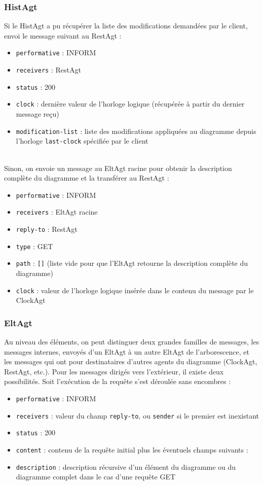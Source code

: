 \subsubsection{HistAgt}
Si le HistAgt a pu récupérer la liste des modifications demandées par le client, envoi le message suivant au RestAgt :
\begin{itemize}
	\item \lstinline$performative$ : INFORM
	\item \lstinline$receivers$ : RestAgt
	\item \lstinline$status$ : 200
	\item \lstinline$clock$ : dernière valeur de l'horloge logique (récupérée à partir du dernier message reçu)
	\item \lstinline$modification-list$ : liste des modifications appliquées au diagramme depuis l'horloge \lstinline$last-clock$ spécifiée par le client
\end{itemize}
~\\
Sinon, on envoie un message au EltAgt racine pour obtenir la description complète du diagramme et la transférer au RestAgt :
\begin{itemize}
	\item \lstinline$performative$ : INFORM
	\item \lstinline$receivers$ : EltAgt racine
	\item \lstinline$reply-to$ : RestAgt
	\item \lstinline$type$ : GET
	\item \lstinline$path$ : \lstinline$[]$ (liste vide pour que l'EltAgt retourne la description complète du diagramme)
	\item \lstinline$clock$ : valeur de l'horloge logique insérée dans le contenu du message par le ClockAgt
\end{itemize}

\subsubsection{EltAgt}
Au niveau des éléments, on peut distinguer deux grandes familles de messages, les messages internes, envoyés d'un EltAgt à un autre EltAgt de l'arborescence, et les messages qui ont pour destinataires d'autres agents du diagramme (ClockAgt, RestAgt, etc.).
Pour les messages dirigés vers l'extérieur, il existe deux possibilités.
Soit l’exécution de la requête s'est déroulée sans encombres :
\begin{itemize}
	\item \lstinline$performative$ : INFORM
	\item \lstinline$receivers$ : valeur du champ \lstinline$reply-to$, ou \lstinline$sender$ si le premier est inexistant	
  \item \lstinline$status$ : 200
  \item \lstinline$content$ : contenu de la requête initial plus les éventuels champs suivants :
  \item \lstinline$description$ : description récursive d'un élément du diagramme ou du diagramme complet dans le cas d'une requête GET
\end{itemize}

